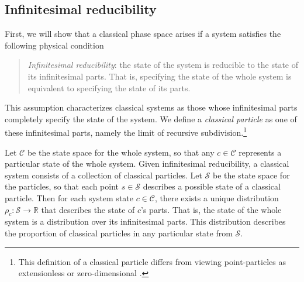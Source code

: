 \documentclass[12pt, english, twoside]{article} %
\newcommand\bs{\begin{singlespace}}
\newcommand\es{\end{singlespace}}
\begin{document}

\subsection{Infinitesimal reducibility}
\label{infinitesimal}

First, we will show that a classical phase space arises if a system satisfies the following physical condition 

\begin{quotation}
\bs \noindent
\textit{Infinitesimal reducibility}: the state of the system is reducible to the state of its infinitesimal parts. That is, specifying the state of the whole system is equivalent to specifying the state of its parts.
\es
\end{quotation}


\noindent
This assumption characterizes classical systems as those whose infinitesimal parts completely specify the state of the system. We define a \textit{classical particle} as one of these infinitesimal parts, namely the limit of recursive subdivision.\footnote{This definition of a classical particle differs from viewing point-particles as extensionless \parencites[]{Butterfieldpoints} or zero-dimensional \parencites[]{Wilson}.}

Let $\mathcal{C}$ be the state space for the whole system, so that any $c \in \mathcal{C}$ represents a particular state of the whole system. Given infinitesimal reducibility, a classical system consists of a collection of classical particles. Let $\mathcal{S}$ be the state space for the particles, so that each point $s \in \mathcal{S}$ describes a possible state of a classical particle. Then for each system state $c \in \mathcal{C}$, there exists a unique distribution $\rho_c : \mathcal{S} \to \mathbb{R} $ that describes the state of $c$'s parts. That is, the state of the whole system is a distribution over its infinitesimal parts. This distribution describes the proportion of classical particles in any particular state from $\mathcal{S}$.
\end{document}
